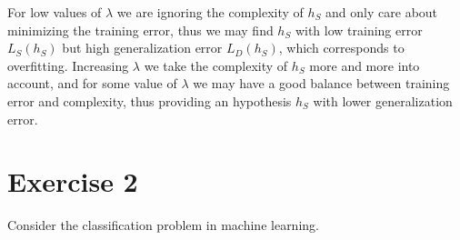 \documentclass[a4paper,11pt,oneside]{book}
\begin{document}
\begin{enumerate}
\begin{solution}

            For low values of $\lambda$ we are ignoring the complexity of $h_S$ and only care about minimizing the training error, thus we may find $h_S$ with low training error $L_S(h_S)$ but high generalization error $L_D(h_S)$, which corresponds to overfitting. Increasing $\lambda$ we take the complexity of $h_S$ more and more into account, and for some value of $\lambda$ we may have a good balance between training error and complexity, thus providing an hypothesis $h_S$ with lower generalization error.
        \end{solution}
\end{enumerate}

\clearpage
\section{Exercise 2}
Consider the classification problem in machine learning.
\end{document}
